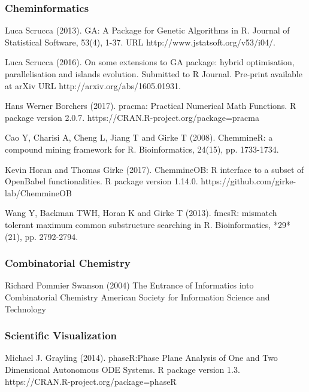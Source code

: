 \begin{thebibliography}{00}
\subsubsection{Cheminformatics}

Luca Scrucca (2013). 
\newblock GA: A Package for Genetic Algorithms in R. 
\newblock Journal of Statistical Software, 53(4), 1-37. URL http://www.jstatsoft.org/v53/i04/.

Luca Scrucca (2016). 
\newblock On some extensions to GA package: hybrid optimisation, parallelisation and islands evolution. Submitted to R Journal. 
\newblock Pre-print available at arXiv URL http://arxiv.org/abs/1605.01931.

Hans Werner Borchers (2017). 
\newblock pracma: Practical Numerical Math Functions. 
\newblock R package version 2.0.7. https://CRAN.R-project.org/package=pracma

Cao Y, Charisi A, Cheng L, Jiang T and Girke T (2008). 
\newblock ChemmineR: a compound mining framework for R.
\newblock Bioinformatics, 24(15), pp. 1733-1734. 

Kevin Horan and Thomas Girke (2017). 
\newblock ChemmineOB: R interface to a subset of OpenBabel functionalities. 
\newblock R package version 1.14.0. https://github.com/girke-lab/ChemmineOB

 Wang Y, Backman TWH, Horan K and Girke T (2013). 
\newblock fmcsR: mismatch tolerant maximum common substructure searching in R.
\newblock Bioinformatics, *29*(21), pp. 2792-2794.

\subsubsection{Combinatorial Chemistry}

Richard Pommier Swanson (2004)
\newblock The Entrance of Informatics into Combinatorial Chemistry
\newblock American Society for Information Science and Technology

	
\subsubsection{Scientific Visualization}
	
	Michael J. Grayling (2014). 
	\newblock phaseR:Phase Plane Analysis of One and Two Dimensional Autonomous ODE Systems. 
	\newblock R package version 1.3. https://CRAN.R-project.org/package=phaseR
	

\end{thebibliography}
